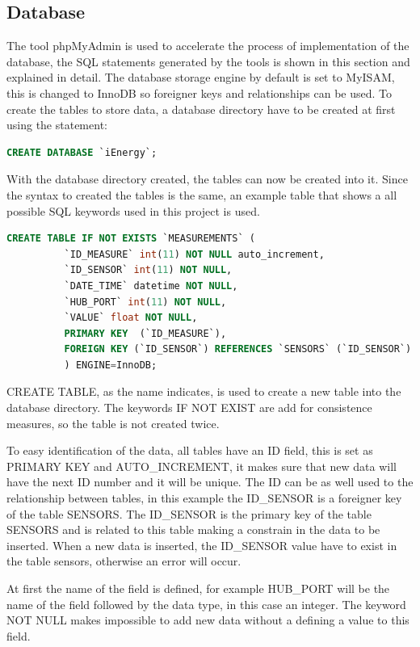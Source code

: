 \subsection{Database}
The tool phpMyAdmin is used to accelerate the process of implementation of the database, the SQL statements generated by the tools is shown in this section and explained in detail.
The database storage engine by default is set to MyISAM, this is changed to InnoDB so foreigner keys and relationships can be used.
To create the tables to store data, a database directory have to be created at first using the statement:
\begin{lstlisting}[language=sql]
		CREATE DATABASE `iEnergy`;
\end{lstlisting}
With the database directory created, the tables can now be created into it. Since the syntax to created the tables is the same, an example table that shows a all possible SQL keywords used in this project is used.
\begin{lstlisting}[language=sql]
		CREATE TABLE IF NOT EXISTS `MEASUREMENTS` (
		  `ID_MEASURE` int(11) NOT NULL auto_increment,
		  `ID_SENSOR` int(11) NOT NULL,
		  `DATE_TIME` datetime NOT NULL,
		  `HUB_PORT` int(11) NOT NULL,
		  `VALUE` float NOT NULL,
		  PRIMARY KEY  (`ID_MEASURE`),
		  FOREIGN KEY (`ID_SENSOR`) REFERENCES `SENSORS` (`ID_SENSOR`)
		  ) ENGINE=InnoDB;
\end{lstlisting}

CREATE TABLE, as the name indicates, is used to create a new table into the database directory. The keywords IF NOT EXIST are add for consistence measures, so the table is not created twice.

To easy identification of the data, all tables have an ID field, this is set as PRIMARY KEY and AUTO\_INCREMENT, it makes sure that new data will have the next ID number and it will be unique. The ID can be as well used to the relationship between tables, in this example the ID\_SENSOR is a foreigner key of the table SENSORS. The ID\_SENSOR is the primary key of the table SENSORS and is related to this table making a constrain in the data to be inserted. When a new data is inserted, the ID\_SENSOR value have to exist in the table sensors, otherwise an error will occur.

At first the name of the field is defined, for example HUB\_PORT will be the name of the field followed by the data type, in this case an integer. The keyword NOT NULL makes impossible to add new data without a defining a value to this field.

